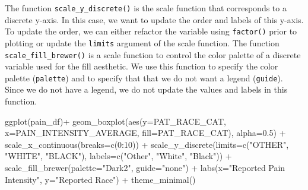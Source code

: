 \documentclass[
  letterpaper,
]{krantz}
\makeatletter
\newenvironment{Shaded}{\begin{snugshade}}{\end{snugshade}}
\newcommand{\AttributeTok}[1]{\textcolor[rgb]{0.40,0.45,0.13}{#1}}
\newcommand{\DecValTok}[1]{\textcolor[rgb]{0.68,0.00,0.00}{#1}}
\newcommand{\FloatTok}[1]{\textcolor[rgb]{0.68,0.00,0.00}{#1}}
\newcommand{\FunctionTok}[1]{\textcolor[rgb]{0.28,0.35,0.67}{#1}}
\newcommand{\NormalTok}[1]{\textcolor[rgb]{0.00,0.23,0.31}{#1}}
\newcommand{\SpecialCharTok}[1]{\textcolor[rgb]{0.37,0.37,0.37}{#1}}
\newcommand{\StringTok}[1]{\textcolor[rgb]{0.13,0.47,0.30}{#1}}
\newenvironment{kframe}{%
\medskip{}
\setlength{\fboxsep}{.8em}
 \def\at@end@of@kframe{}%
 \ifinner\ifhmode%
  \def\at@end@of@kframe{\end{minipage}}%
  \begin{minipage}{\columnwidth}%
 \fi\fi%
 \def\FrameCommand##1{\hskip\@totalleftmargin \hskip-\fboxsep
 \colorbox{shadecolor}{##1}\hskip-\fboxsep
     \hskip-\linewidth \hskip-\@totalleftmargin \hskip\columnwidth}%
 \MakeFramed {\advance\hsize-\width
   \@totalleftmargin\z@ \linewidth\hsize
   \@setminipage}}%
 {\par\unskip\endMakeFramed%
 \at@end@of@kframe}
\renewenvironment{Shaded}{\begin{kframe}}{\end{kframe}}
\makeatother
\begin{document}
The function \texttt{scale\_y\_discrete()} is the scale function that
corresponds to a discrete y-axis. In this case, we want to update the
order and labels of this y-axis. To update the order, we can either
refactor the variable using \texttt{factor()} prior to plotting or
update the \texttt{limits} argument of the scale function. The function
\texttt{scale\_fill\_brewer()} is a scale function to control the color
palette of a discrete variable used for the fill aesthetic. We use this
function to specify the color palette (\texttt{palette}) and to specify
that that we do not want a legend (\texttt{guide}). Since we do not have
a legend, we do not update the values and labels in this function.

\begin{Shaded}
\begin{Highlighting}[]
\FunctionTok{ggplot}\NormalTok{(pain\_df)}\SpecialCharTok{+}
  \FunctionTok{geom\_boxplot}\NormalTok{(}\FunctionTok{aes}\NormalTok{(}\AttributeTok{y=}\NormalTok{PAT\_RACE\_CAT, }\AttributeTok{x=}\NormalTok{PAIN\_INTENSITY\_AVERAGE, }
                   \AttributeTok{fill=}\NormalTok{PAT\_RACE\_CAT), }\AttributeTok{alpha=}\FloatTok{0.5}\NormalTok{) }\SpecialCharTok{+}
  \FunctionTok{scale\_x\_continuous}\NormalTok{(}\AttributeTok{breaks=}\FunctionTok{c}\NormalTok{(}\DecValTok{0}\SpecialCharTok{:}\DecValTok{10}\NormalTok{)) }\SpecialCharTok{+}
  \FunctionTok{scale\_y\_discrete}\NormalTok{(}\AttributeTok{limits=}\FunctionTok{c}\NormalTok{(}\StringTok{"OTHER"}\NormalTok{, }\StringTok{"WHITE"}\NormalTok{, }\StringTok{"BLACK"}\NormalTok{), }
                   \AttributeTok{labels=}\FunctionTok{c}\NormalTok{(}\StringTok{"Other"}\NormalTok{, }\StringTok{"White"}\NormalTok{, }\StringTok{"Black"}\NormalTok{)) }\SpecialCharTok{+}
  \FunctionTok{scale\_fill\_brewer}\NormalTok{(}\AttributeTok{palette=}\StringTok{"Dark2"}\NormalTok{, }\AttributeTok{guide=}\StringTok{"none"}\NormalTok{) }\SpecialCharTok{+}
  \FunctionTok{labs}\NormalTok{(}\AttributeTok{x=}\StringTok{"Reported Pain Intensity"}\NormalTok{, }\AttributeTok{y=}\StringTok{"Reported Race"}\NormalTok{) }\SpecialCharTok{+}
  \FunctionTok{theme\_minimal}\NormalTok{()}
\end{Highlighting}
\end{Shaded}
\end{document}
